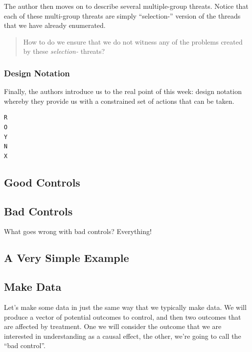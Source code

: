 \documentclass[
]{article}
\theoremstyle{definition}
\theoremstyle{definition}
\theoremstyle{definition}
\theoremstyle{definition}
\theoremstyle{remark}
\begin{document}
The author then moves on to describe several multiple-group threats. Notice that each of these multi-group threats are simply ``selection-'' version of the threads that we have already enumerated.

\begin{quote}
How to do we ensure that we do not witness any of the problems created by these \emph{selection-} threats?
\end{quote}

\subsubsection{Design Notation}\label{design-notation-1}

Finally, the authors introduce us to the real point of this week: design notation whereby they provide us with a constrained set of actions that can be taken.

\begin{verbatim}
R
O 
Y 
N 
X 
\end{verbatim}

\subsection{Good Controls}\label{good-controls}

\subsection{Bad Controls}\label{bad-controls}

What goes wrong with bad controls? Everything!

\subsection{A Very Simple Example}\label{a-very-simple-example}

\subsection{Make Data}\label{make-data-1}

Let's make some data in just the same way that we typically make data. We will produce a vector of potential outcomes to control, and then two outcomes that are affected by treatment. One we will consider the outcome that we are interested in understanding as a causal effect, the other, we're going to call the ``bad control''.
\end{document}
